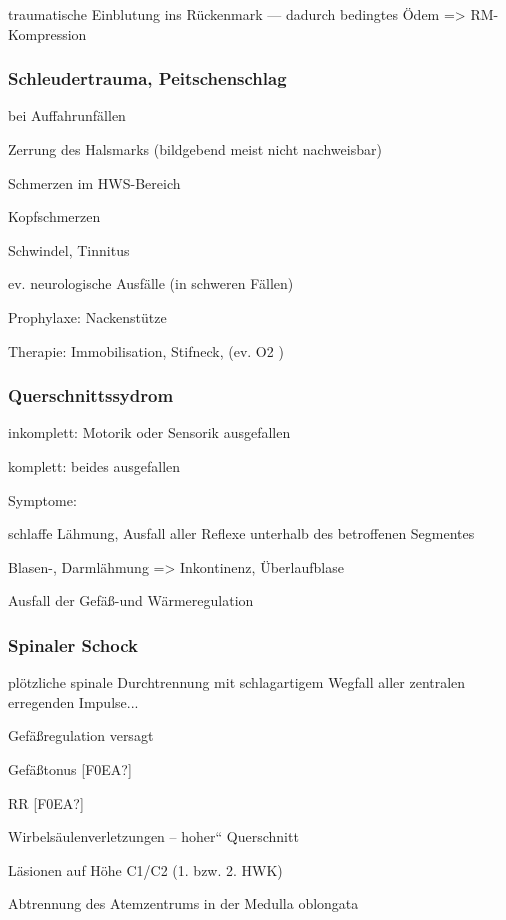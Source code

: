 traumatische Einblutung ins R\"uckenmark --- dadurch bedingtes \"Odem ={\textgreater} RM-Kompression

\subsubsection{Schleudertrauma, Peitschenschlag}

bei Auffahrunf\"allen

Zerrung des Halsmarks (bildgebend meist nicht nachweisbar)

Schmerzen im HWS-Bereich

Kopfschmerzen

Schwindel, Tinnitus

ev. neurologische Ausf\"alle (in schweren F\"allen)

Prophylaxe: Nackenst\"utze

Therapie: Immobilisation, Stifneck, (ev. O2 )

\subsubsection{Querschnittssydrom}

inkomplett: Motorik oder Sensorik  ausgefallen

komplett: beides ausgefallen

Symptome:

schlaffe L\"ahmung, Ausfall aller Reflexe  unterhalb des betroffenen
Segmentes

Blasen-, Darml\"ahmung ={\textgreater} Inkontinenz,  \"Uberlaufblase

Ausfall der Gef\"a{\ss}-und W\"armeregulation

\subsubsection{Spinaler Schock}

pl\"otzliche spinale Durchtrennung mit  schlagartigem Wegfall aller
zentralen  erregenden Impulse...

Gef\"a{\ss}regulation versagt

Gef\"a{\ss}tonus [F0EA?]

RR [F0EA?]  

Wirbels\"aulenverletzungen -- {\quotedblbase}hoher{\textquotedblleft} 
Querschnitt

L\"asionen auf H\"ohe C1/C2 (1. bzw. 2.  HWK)

Abtrennung des Atemzentrums in der Medulla  oblongata

